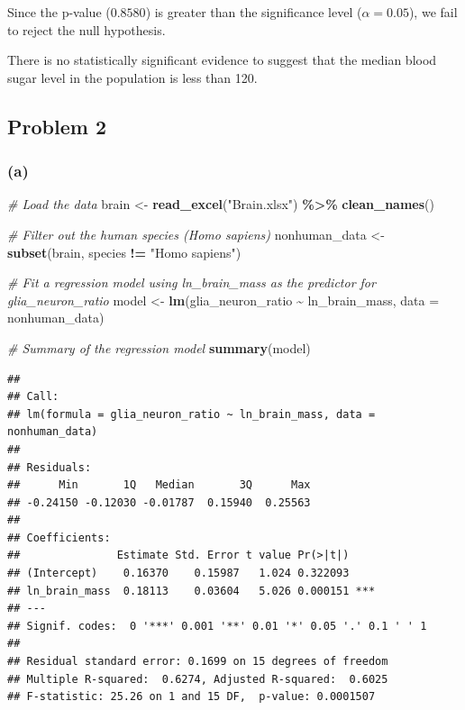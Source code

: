 \documentclass[
]{article}
\newenvironment{Shaded}{\begin{snugshade}}{\end{snugshade}}
\newcommand{\AttributeTok}[1]{\textcolor[rgb]{0.13,0.29,0.53}{#1}}
\newcommand{\CommentTok}[1]{\textcolor[rgb]{0.56,0.35,0.01}{\textit{#1}}}
\newcommand{\FunctionTok}[1]{\textcolor[rgb]{0.13,0.29,0.53}{\textbf{#1}}}
\newcommand{\NormalTok}[1]{#1}
\newcommand{\OtherTok}[1]{\textcolor[rgb]{0.56,0.35,0.01}{#1}}
\newcommand{\SpecialCharTok}[1]{\textcolor[rgb]{0.81,0.36,0.00}{\textbf{#1}}}
\newcommand{\StringTok}[1]{\textcolor[rgb]{0.31,0.60,0.02}{#1}}
\begin{document}
Since the p-value (\(0.8580\)) is greater than the significance level
(\(\alpha = 0.05\)), we fail to reject the null hypothesis.

There is no statistically significant evidence to suggest that the
median blood sugar level in the population is less than 120.

\subsection{Problem 2}\label{problem-2}

\subsubsection{(a)}\label{a}

\begin{Shaded}
\begin{Highlighting}[]
\CommentTok{\# Load the data}
\NormalTok{brain }\OtherTok{\textless{}{-}} \FunctionTok{read\_excel}\NormalTok{(}\StringTok{"Brain.xlsx"}\NormalTok{) }\SpecialCharTok{\%\textgreater{}\%} 
  \FunctionTok{clean\_names}\NormalTok{()}


\CommentTok{\# Filter out the human species (Homo sapiens)}
\NormalTok{nonhuman\_data }\OtherTok{\textless{}{-}} \FunctionTok{subset}\NormalTok{(brain, species }\SpecialCharTok{!=} \StringTok{"Homo sapiens"}\NormalTok{)}

\CommentTok{\# Fit a regression model using ln\_brain\_mass as the predictor for glia\_neuron\_ratio}
\NormalTok{model }\OtherTok{\textless{}{-}} \FunctionTok{lm}\NormalTok{(glia\_neuron\_ratio }\SpecialCharTok{\textasciitilde{}}\NormalTok{ ln\_brain\_mass, }\AttributeTok{data =}\NormalTok{ nonhuman\_data)}

\CommentTok{\# Summary of the regression model}
\FunctionTok{summary}\NormalTok{(model)}
\end{Highlighting}
\end{Shaded}

\begin{verbatim}
## 
## Call:
## lm(formula = glia_neuron_ratio ~ ln_brain_mass, data = nonhuman_data)
## 
## Residuals:
##      Min       1Q   Median       3Q      Max 
## -0.24150 -0.12030 -0.01787  0.15940  0.25563 
## 
## Coefficients:
##               Estimate Std. Error t value Pr(>|t|)    
## (Intercept)    0.16370    0.15987   1.024 0.322093    
## ln_brain_mass  0.18113    0.03604   5.026 0.000151 ***
## ---
## Signif. codes:  0 '***' 0.001 '**' 0.01 '*' 0.05 '.' 0.1 ' ' 1
## 
## Residual standard error: 0.1699 on 15 degrees of freedom
## Multiple R-squared:  0.6274, Adjusted R-squared:  0.6025 
## F-statistic: 25.26 on 1 and 15 DF,  p-value: 0.0001507
\end{verbatim}
\end{document}
